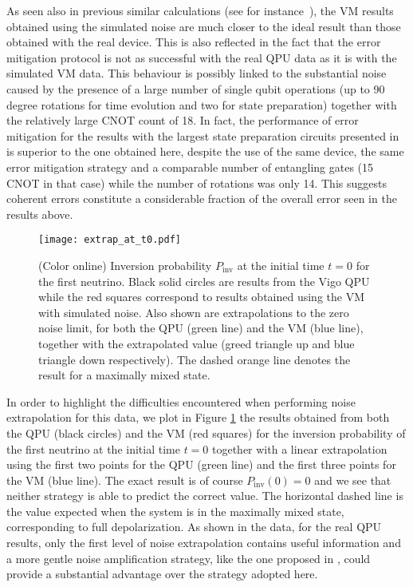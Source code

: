 \documentclass[10pt]{article}
\begin{document}
As seen also in previous similar calculations (see for instance~\cite{roggero2020A,Roggero_nptodg}), the VM results obtained using the simulated noise are much closer to the ideal result than those obtained with the real device. This is also reflected in the fact that the error mitigation protocol is not as successful with the real QPU data as it is with the simulated VM data. This behaviour is possibly linked to the substantial noise caused by the presence of a large number of single qubit operations (up to 90 degree rotations for time evolution and two for state preparation) together with the relatively large CNOT count of 18. In fact, the performance of error mitigation for the results with the largest state preparation circuits presented in~\cite{Roggero_nptodg} is superior to the one obtained here, despite the use of the same device, the same error mitigation strategy and a comparable number of entangling gates (15 CNOT in that case) while the number of rotations was only 14. This suggests coherent errors constitute a considerable fraction of the overall error seen in the results above.

\begin{figure}[t]
 \centering
 \texttt{[image: extrap\_at\_t0.pdf]}
 \caption{(Color online) Inversion probability $P_{\text{inv}}$ at the initial time $t=0$ for the first neutrino. Black solid circles are results from the Vigo QPU~\cite{IBMQ_Vigo} while the red squares correspond to results obtained using the VM with simulated noise. Also shown are extrapolations to the zero noise limit, for both the QPU (green line) and the VM (blue line), together with the extrapolated value (greed triangle up and blue triangle down respectively). The dashed orange line denotes the result for a maximally mixed state.}
\label{fig:pop_extrap}
\end{figure}

In order to highlight the difficulties encountered when performing noise extrapolation for this data, we plot in Figure \ref{fig:pop_extrap} the results obtained from both the QPU (black circles) and the VM (red squares) for the inversion probability of the first neutrino at the initial time $t=0$ together with a linear extrapolation using the first two points for the QPU (green line) and the first three points for the VM (blue line). The exact result is of course $P_{\text{inv}}(0)=0$ and we see that neither strategy is able to predict the correct value. The horizontal dashed line is the value expected when the system is in the maximally mixed state, corresponding to full depolarization. As shown in the data, for the real QPU results, only the first level of noise extrapolation contains useful information and a more gentle noise amplification strategy, like the one proposed in \cite{He2020}, could provide a substantial advantage over the strategy adopted here.
\end{document}
